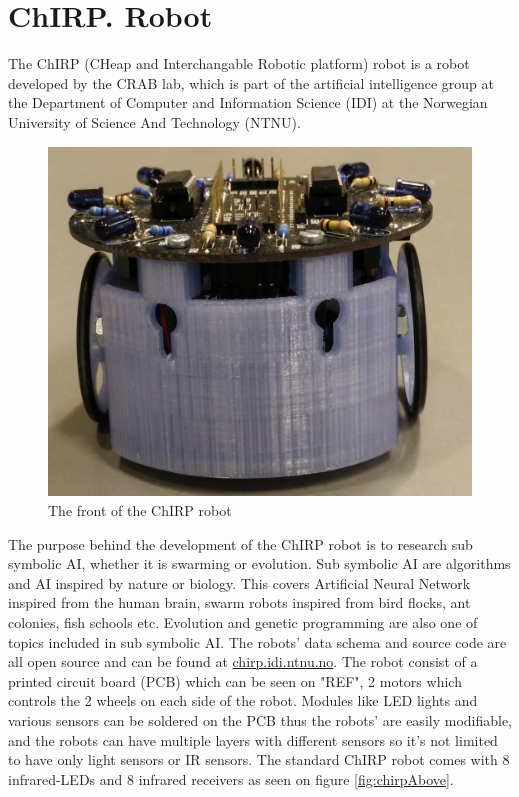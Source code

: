 \section{ChIRP. Robot}
The ChIRP (CHeap and Interchangable Robotic platform) robot is a robot developed by the CRAB lab, which is part of the artificial intelligence group at the Department of Computer and Information Science (IDI) at the Norwegian University of Science And Technology (NTNU).
\begin{figure}[h]
\centering
\includegraphics[width=0.8\linewidth]{images/chirpFront.jpg}
\caption{The front of the ChIRP robot}
\label{fig:chirpsFront}
\end{figure}
The purpose behind the development of the ChIRP robot is to research sub symbolic AI, whether it is swarming or evolution. Sub symbolic AI are algorithms and AI inspired by nature or biology. This covers Artificial Neural Network inspired from the human brain, swarm robots inspired from bird flocks, ant colonies, fish schools etc. Evolution and genetic programming are also one of topics included in sub symbolic AI.
The robots' data schema and source code are all open source and can be found at \href{http://chirp.idi.ntnu.no}{chirp.idi.ntnu.no}. The robot consist of a printed circuit board (PCB) which can be seen on "REF", 2 motors which controls the 2 wheels on each side of the robot.
Modules like LED lights and various sensors can be soldered on the PCB thus the robots' are easily modifiable, and the robots can have multiple layers with different sensors so it's not limited to have only light sensors or IR sensors. The standard ChIRP robot comes with 8 infrared-LEDs and 8 infrared receivers as seen on figure \ref{fig:chirpAbove}.
